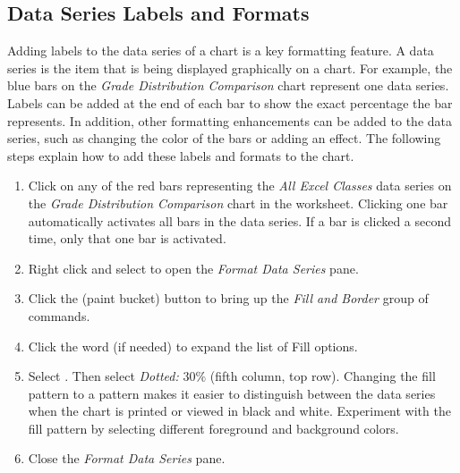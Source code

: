 \subsection{Data Series Labels and Formats}

Adding labels to the data series of a chart is a key formatting feature. A data series is the item that is being displayed graphically on a chart. For example, the blue bars on the \textit{Grade Distribution Comparison} chart represent one data series. Labels can be added at the end of each bar to show the exact percentage the bar represents. In addition, other formatting enhancements can be added to the data series, such as changing the color of the bars or adding an effect. The following steps explain how to add these labels and formats to the chart.

\begin{enumerate}
	\item Click on any of the red bars representing the \textit{All Excel Classes} data series on the \textit{Grade Distribution Comparison} chart in the  worksheet. Clicking one bar automatically activates all bars in the data series. If a bar is clicked a second time, only that one bar is activated.
	\item Right click and select  to open the \textit{Format Data Series} pane.
	\item Click the  (paint bucket) button to bring up the \textit{Fill and Border} group of commands.
	\item Click the word  (if needed) to expand the list of Fill options.
	\item Select . Then select \textit{Dotted: }$ 30\% $ (fifth column, top row). Changing the fill pattern to a pattern makes it easier to distinguish between the data series when the chart is printed or viewed in black and white. Experiment with the fill pattern by selecting different foreground and background colors.
	\item Close the \textit{Format Data Series} pane.
\end{enumerate}

